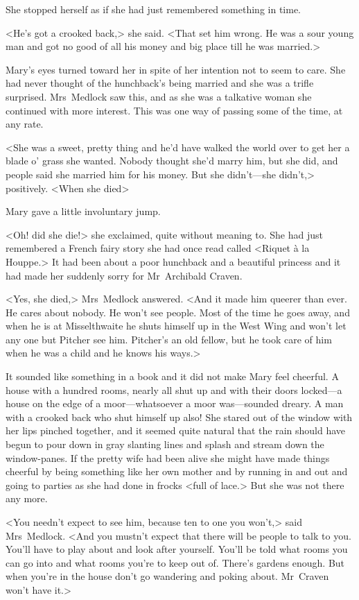 She stopped herself as if she had just remembered something in time.

<He's got a crooked back,> she said. <That set him wrong. He was a sour young man and got no good of all his money and big place till he was married.>

Mary's eyes turned toward her in spite of her intention not to seem to care. She had never thought of the hunchback's being married and she was a trifle surprised. Mrs~Medlock saw this, and as she was a talkative woman she continued with more interest. This was one way of passing some of the time, at any rate.

<She was a sweet, pretty thing and he'd have walked the world over to get her a blade o' grass she wanted. Nobody thought she'd marry him, but she did, and people said she married him for his money. But she didn't—she didn't,> positively. <When she died\longdash>

Mary gave a little involuntary jump.

<Oh! did she die!> she exclaimed, quite without meaning to. She had just remembered a French fairy story she had once read called <Riquet à la Houppe.> It had been about a poor hunchback and a beautiful princess and it had made her suddenly sorry for Mr~Archibald Craven.

<Yes, she died,> Mrs~Medlock answered. <And it made him queerer than ever. He cares about nobody. He won't see people. Most of the time he goes away, and when he is at Misselthwaite he shuts himself up in the West Wing and won't let any one but Pitcher see him. Pitcher's an old fellow, but he took care of him when he was a child and he knows his ways.>

It sounded like something in a book and it did not make Mary feel cheerful. A house with a hundred rooms, nearly all shut up and with their doors locked—a house on the edge of a moor—whatsoever a moor was—sounded dreary. A man with a crooked back who shut himself up also! She stared out of the window with her lips pinched together, and it seemed quite natural that the rain should have begun to pour down in gray slanting lines and splash and stream down the window-panes. If the pretty wife had been alive she might have made things cheerful by being something like her own mother and by running in and out and going to parties as she had done in frocks <full of lace.> But she was not there any more.

<You needn't expect to see him, because ten to one you won't,> said Mrs~Medlock. <And you mustn't expect that there will be people to talk to you. You'll have to play about and look after yourself. You'll be told what rooms you can go into and what rooms you're to keep out of. There's gardens enough. But when you're in the house don't go wandering and poking about. Mr~Craven won't have it.>

